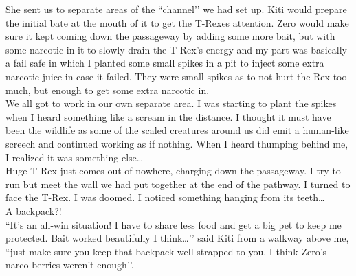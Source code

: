 \documentclass[a4paper,onecolumn,11pt]{article}
\begin{document}
\newline
She sent us to separate areas of the ``channel’’ we had set up. Kiti would prepare the initial bate at the mouth of it to get the T-Rexes attention. Zero would make sure it kept coming down the passageway by adding some more bait, but with some narcotic in it to slowly drain the T-Rex’s energy and my part was basically a fail safe in which I planted some small spikes in a pit to inject some extra narcotic juice in case it failed. They were small spikes as to not hurt the Rex too much, but enough to get some extra narcotic in.\\
\newline
We all got to work in our own separate area. I was starting to plant the spikes when I heard something like a scream in the distance. I thought it must have been the wildlife as some of the scaled creatures around us did emit a human-like screech and continued working as if nothing. When I heard thumping behind me, I realized it was something else\ldots \\
\newline
Huge T-Rex just comes out of nowhere, charging down the passageway. I try to run but meet the wall we had put together at the end of the pathway. I turned to face the T-Rex. I was doomed. I noticed something hanging from its teeth\ldots \\
\newline
A backpack?!\\
\newline
``It’s an all-win situation! I have to share less food and get a big pet to keep me protected. Bait worked beautifully I think…’’ said Kiti from a walkway above me, ``just make sure you keep that backpack well strapped to you. I think Zero’s narco-berries weren’t enough’’.

\newpage



\end{document}
